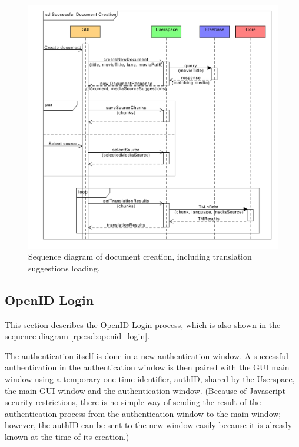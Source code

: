 \begin{figure}[h]
\begin{center}
\includegraphics[scale=0.65]{figures/document_creation_sequence_RPC.pdf}
\end{center}
\caption{Sequence diagram of document creation, including translation suggestions loading.}\label{rpc:sd:document_creation}
\end{figure}

\subsection{OpenID Login}
\label{sec:OpenID_Login}

This section describes the OpenID Login process, which is also shown in the sequence diagram \ref{rpc:sd:openid_login}.

The authentication itself is done in a new authentication window.
A successful authentication in the authentication window is then paired with the GUI main window using a temporary one-time identifier, authID, shared by the Userspace, the main GUI window and the authentication window.
(Because of Javascript security restrictions, there is no simple way of sending the result of the authentication process from the authentication window to the main window;
however, the authID can be sent to the new window easily because it is already known at the time of its creation.)

